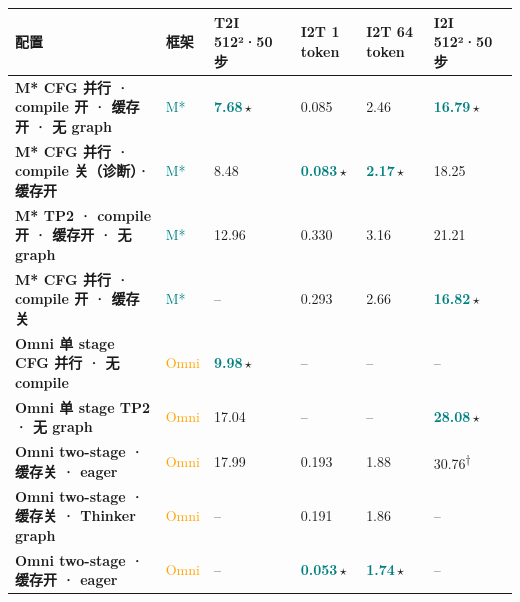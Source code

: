 \begin{tabularx}{\textwidth}{>{\bfseries}p{5.9cm} p{0.9cm} Y Y Y Y}
\toprule
{}
配置 & 框架 & T2I 512²·50 步 & I2T 1 token & I2T 64 token & I2I 512²·50 步 \\
\midrule
M* CFG 并行 · compile 开 · 缓存开 · 无 graph & \textcolor{Teal}{M*} & \textbf{\textcolor{Teal}{7.68}}\,$\star$ & 0.085 & 2.46 & \textbf{\textcolor{Teal}{16.79}}\,$\star$ \\
M* CFG 并行 · compile 关（诊断）· 缓存开 & \textcolor{Teal}{M*} & 8.48 & \textbf{\textcolor{Teal}{0.083}}\,$\star$ & \textbf{\textcolor{Teal}{2.17}}\,$\star$ & 18.25 \\
M* TP2 · compile 开 · 缓存开 · 无 graph & \textcolor{Teal}{M*} & 12.96 & 0.330 & 3.16 & 21.21 \\
M* CFG 并行 · compile 开 · 缓存关 & \textcolor{Teal}{M*} & -- & 0.293 & 2.66 & \textbf{\textcolor{Teal}{16.82}}\,$\star$ \\
\midrule
Omni 单 stage CFG 并行 · 无 compile & \textcolor{Orange}{Omni} & \textbf{\textcolor{Teal}{9.98}}\,$\star$ & -- & -- & -- \\
Omni 单 stage TP2 · 无 graph & \textcolor{Orange}{Omni} & 17.04 & -- & -- & \textbf{\textcolor{Teal}{28.08}}\,$\star$ \\
Omni two-stage · 缓存关 · eager & \textcolor{Orange}{Omni} & 17.99 & 0.193 & 1.88 & \textcolor{Muted}{30.76\textsuperscript{†}} \\
Omni two-stage · 缓存关 · Thinker graph & \textcolor{Orange}{Omni} & -- & 0.191 & 1.86 & -- \\
Omni two-stage · 缓存开 · eager & \textcolor{Orange}{Omni} & -- & \textbf{\textcolor{Teal}{0.053}}\,$\star$ & \textbf{\textcolor{Teal}{1.74}}\,$\star$ & -- \\
\bottomrule
\end{tabularx}
